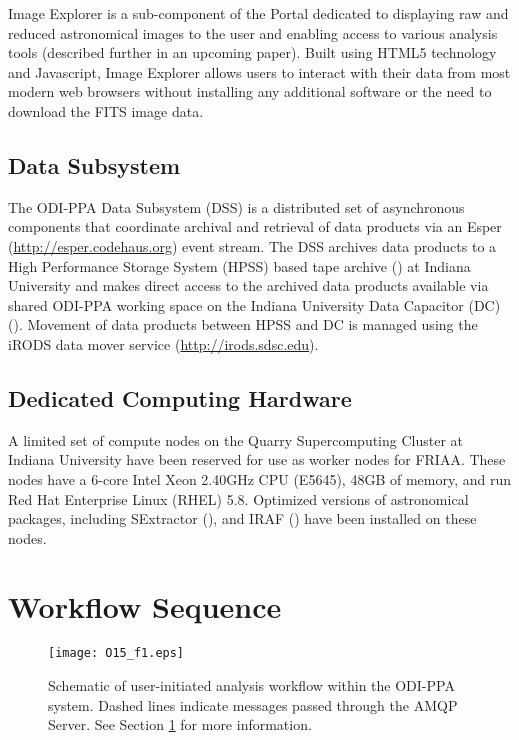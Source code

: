 \documentclass[11pt,twoside]{article}
\begin{document}
Image Explorer is a sub-component of the Portal dedicated to displaying raw and reduced astronomical images to the user and enabling access to various analysis tools (described further in an upcoming paper).   Built using HTML5 technology and Javascript, Image Explorer allows users to interact with their data from most modern web browsers without installing any additional software or the need to download the FITS image data.

\subsection{Data Subsystem}
\label{section:dss}

The ODI-PPA Data Subsystem (DSS) is a distributed set of asynchronous components that coordinate archival and retrieval of data products via an Esper (\url{http://esper.codehaus.org}) event stream. The DSS archives data products to a High Performance Storage System (HPSS) based tape archive (\cite{hpss}) at Indiana University and makes direct access to the archived data products available via shared ODI-PPA working space on the Indiana University Data Capacitor (DC) (\cite{dataCapacitor}).  Movement of data products between HPSS and DC is managed using the iRODS data mover service (\url{http://irods.sdsc.edu}).  

\subsection{Dedicated Computing Hardware}
\label{section:wn}

A limited set of compute nodes on the Quarry Supercomputing Cluster at Indiana University have been reserved for use as worker nodes for %
FRIAA.  These nodes have a 6-core Intel Xeon 2.40GHz CPU (E5645), 48GB of memory, and run Red Hat Enterprise Linux (RHEL) 5.8.  Optimized versions of astronomical packages, including SExtractor (\cite{sextractor}), and IRAF (\cite{iraf}) have been installed on these nodes. 

\section{Workflow Sequence}
\label{section:workflow}

\begin{figure}
\texttt{[image: O15\_f1.eps]}
\caption{Schematic of user-initiated analysis workflow within the ODI-PPA system.  Dashed lines indicate messages passed through the AMQP Server. See Section \ref{section:workflow} for more information.}
\label{fig:workflow}
\end{figure}
\end{document}
